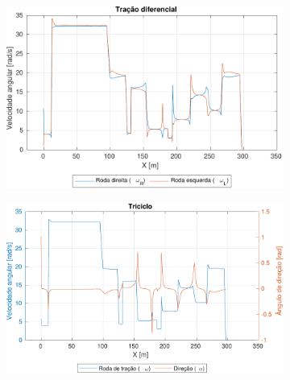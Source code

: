 \documentclass{article}
\begin{document}
\begin{figure}[ht]
     \centering
     \begin{subfigure}[b]{0.49\textwidth}
         \centering
         \includegraphics[width=\textwidth]{figs/diff_wheels.pdf}
         \caption{}
         \label{fig:diff_wheels}
     \end{subfigure}
     \hfill
     \begin{subfigure}[b]{0.49\textwidth}
         \centering
         \includegraphics[width=\textwidth]{figs/tri_wheels.pdf}
         \caption{}
         \label{fig:tri_wheels}
     \end{subfigure}
     

\end{figure}
\end{document}
